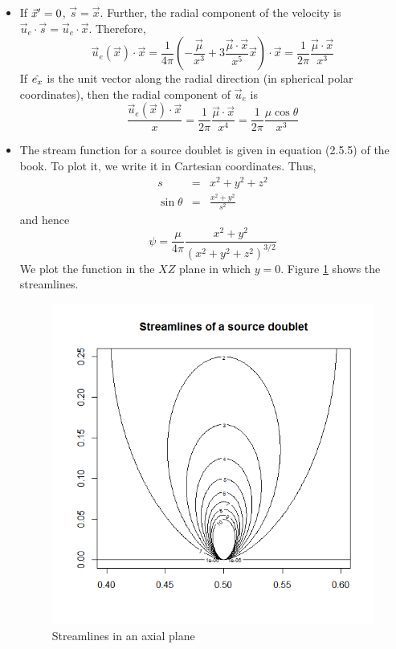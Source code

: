 \begin{itemize}
\item If $\vec{x}^\prime = 0$, $\vec{s} = \vec{x}$. Further, the radial component of the velocity is $\vec{u}_e\cdot\vec{s} = \vec{u}_e\cdot\vec{x}$. Therefore,
\[
\vec{u}_e(\vec{x})\cdot\vec{x} = \frac{1}{4\pi}\left(-\frac{\vec{\mu}}{x^3} + 3 \frac{\vec{\mu}\cdot\vec{x}}{x^5}\vec{x}\right)\cdot\vec{x} = 
\frac{1}{2\pi}\frac{\vec{\mu}\cdot\vec{x}}{x^3}
\]
If $\hat{e_{x}}$ is the unit vector along the radial direction (in spherical polar coordinates), then the radial component of $\vec{u}_e$ is
\[
\frac{\vec{u}_e(\vec{x})\cdot\vec{x}}{x} = \frac{1}{2\pi}\frac{\vec{\mu}\cdot\vec{x}}{x^4} = \frac{1}{2\pi}\frac{{\mu}\cos\theta}{x^3}
\]

\item The stream function for a source doublet is given in equation (2.5.5) of the book. To plot it, we write it in Cartesian coordinates. Thus, 
\begin{eqnarray*}
s &=& x^2 + y^2 + z^2 \\
\sin\theta &=& \frac{x^2 + y^2}{s^2}
\end{eqnarray*}
and hence
\[
\psi = \frac{\mu}{4\pi}\frac{x^2 + y^2}{(x^2 + y^2 + z^2)^{3/2}}
\]
We plot the function in the $XZ$ plane in which $y = 0$. Figure \ref{c2f2} shows the streamlines.
\begin{figure}[!ht]
\centering
\centerline{\includegraphics[scale=.5]{c2f2}}
\caption{Streamlines in an axial plane}
\label{c2f2}
\end{figure}


\end{itemize}

